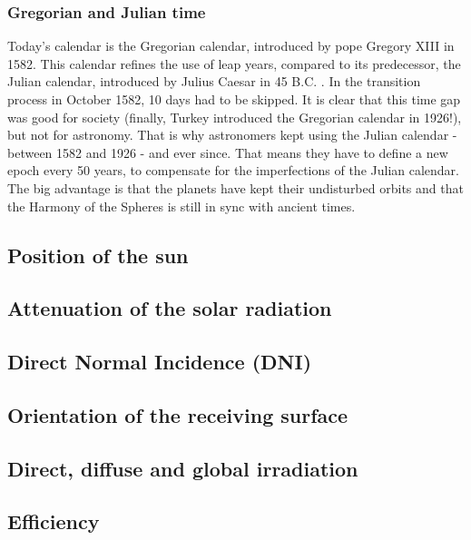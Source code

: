 \subsubsection{Gregorian and Julian time}

Today's calendar is the Gregorian calendar, introduced by pope Gregory XIII in 1582. This calendar refines the use of leap years, compared to its predecessor, the Julian calendar, introduced by Julius Caesar in 45 B.C. \cite{timeanddate}. In the transition process in October 1582, 10 days had to be skipped. It is clear that this time gap was good for society (finally, Turkey introduced the Gregorian calendar in 1926!), but not for astronomy. That is why astronomers kept using the Julian calendar - between 1582 and 1926 - and ever since. That means they have to define a new epoch every 50 years, to compensate for the imperfections of the Julian calendar. The big advantage is that the planets have kept their undisturbed orbits and that the Harmony of the Spheres is still in sync with ancient times.

\subsection{Position of the sun}

\subsection{Attenuation of the solar radiation}

\subsection{Direct Normal Incidence (DNI)}

\subsection{Orientation of the receiving surface}

\subsection{Direct, diffuse and global irradiation}

\subsection{Efficiency}

\newpage